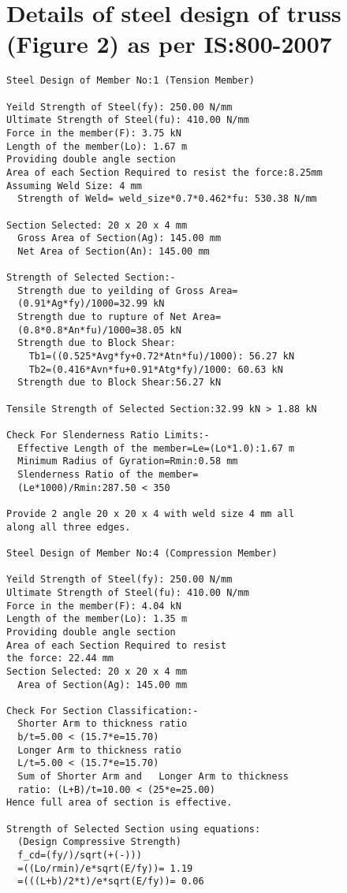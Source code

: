\documentclass[preprint]{elsarticle}
\begin{document}
\section{Details of steel design of truss (Figure 2) as per IS:800-2007} \label{App:DetailedResult}
\begin{verbatim}
Steel Design of Member No:1 (Tension Member)

Yeild Strength of Steel(fy): 250.00 N/mm 
Ultimate Strength of Steel(fu): 410.00 N/mm 
Force in the member(F): 3.75 kN 
Length of the member(Lo): 1.67 m 
Providing double angle section
Area of each Section Required to resist the force:8.25mm  
Assuming Weld Size: 4 mm 
  Strength of Weld= weld_size*0.7*0.462*fu: 530.38 N/mm  

Section Selected: 20 x 20 x 4 mm 
  Gross Area of Section(Ag): 145.00 mm  
  Net Area of Section(An): 145.00 mm  

Strength of Selected Section:-
  Strength due to yeilding of Gross Area=
  (0.91*Ag*fy)/1000=32.99 kN 
  Strength due to rupture of Net Area=
  (0.8*0.8*An*fu)/1000=38.05 kN 
  Strength due to Block Shear:
    Tb1=((0.525*Avg*fy+0.72*Atn*fu)/1000): 56.27 kN 
    Tb2=(0.416*Avn*fu+0.91*Atg*fy)/1000: 60.63 kN 
  Strength due to Block Shear:56.27 kN 

Tensile Strength of Selected Section:32.99 kN > 1.88 kN 

Check For Slenderness Ratio Limits:- 
  Effective Length of the member=Le=(Lo*1.0):1.67 m 
  Minimum Radius of Gyration=Rmin:0.58 mm
  Slenderness Ratio of the member=
  (Le*1000)/Rmin:287.50 < 350 

Provide 2 angle 20 x 20 x 4 with weld size 4 mm all 
along all three edges.
 
Steel Design of Member No:4 (Compression Member)

Yeild Strength of Steel(fy): 250.00 N/mm 
Ultimate Strength of Steel(fu): 410.00 N/mm 
Force in the member(F): 4.04 kN 
Length of the member(Lo): 1.35 m 
Providing double angle section
Area of each Section Required to resist 
the force: 22.44 mm  
Section Selected: 20 x 20 x 4 mm 
  Area of Section(Ag): 145.00 mm  

Check For Section Classification:- 
  Shorter Arm to thickness ratio 
  b/t=5.00 < (15.7*e=15.70)
  Longer Arm to thickness ratio  
  L/t=5.00 < (15.7*e=15.70)
  Sum of Shorter Arm and   Longer Arm to thickness 
  ratio: (L+B)/t=10.00 < (25*e=25.00)
Hence full area of section is effective.

Strength of Selected Section using equations:
  (Design Compressive Strength)
  f_cd=(fy/)/sqrt(+(-)))
  =((Lo/rmin)/e*sqrt(E/fy))= 1.19
  =(((L+b)/2*t)/e*sqrt(E/fy))= 0.06


\end{verbatim}
\end{document}
